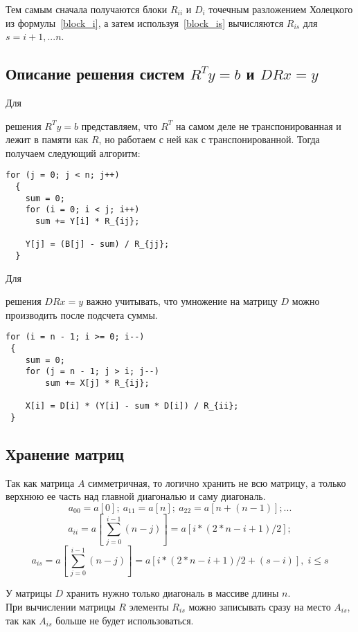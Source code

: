 \documentclass[a4paper,12pt]{article}
\begin{document}
    Тем самым сначала получаются блоки $R_{ii}$ и $D_i$ точечным разложением 
    Холецкого из формулы~\eqref{block_i}, а затем используя~\eqref{block_is} 
    вычисляются $R_{is}$ для $s = i+1,...n$.


\subsection{Описание решения систем $R^T y = b$ и $DRx = y$}
    \hypertarget{calc_y}{Для} 
    решения $R^T y = b$ представляем, что $R^T$ на самом деле не транспонированная
    и лежит в памяти как $R$, но работаем с ней как с транспонированной. 
    Тогда получаем следующий алгоритм:
    
    \begin{verbatim}
for (j = 0; j < n; j++) 
  {
    sum = 0;
    for (i = 0; i < j; i++)
      sum += Y[i] * R_{ij};
    
    Y[j] = (B[j] - sum) / R_{jj};
  }
    \end{verbatim}

    \hypertarget{calc_x}{Для} 
    решения $DRx = y$ важно учитывать, что умножение на матрицу $D$ можно производить после подсчета суммы.
    
    \begin{verbatim}
for (i = n - 1; i >= 0; i--)
 {
    sum = 0;
    for (j = n - 1; j > i; j--)
        sum += X[j] * R_{ij};
    
    X[i] = D[i] * (Y[i] - sum * D[i]) / R_{ii};
 }
    \end{verbatim}


\subsection{Хранение матриц}
    Так как матрица $A$ симметричная, то логично хранить не всю матрицу, 
    а только верхнюю ее часть над главной диагональю и саму диагональ. 
    $$ a_{00} = a [0]; \ a_{11} = a [n]; \ a_{22} = a [n + (n-1)]; ... $$
    $$ a_{ii} = a [\,\sum_{j=0}^{i-1}(n-j)] = a [i * (2 * n - i +1) / 2];  $$
    $$ 
        a_{is} = a [\,\sum_{j=0}^{i-1}(n-j)] = a [i * (2 * n - i +1) / 2 + (s - i)], 
        \; i \leq s  
    $$
    
    У матрицы $D$ хранить нужно только диагональ в массиве длины $n$.\\
    
    При вычислении матрицы $R$ элементы $R_{is}$ можно записывать сразу на место $A_{is}$,
    так как $A_{is}$ больше не будет использоваться. 
    
\end{document}
